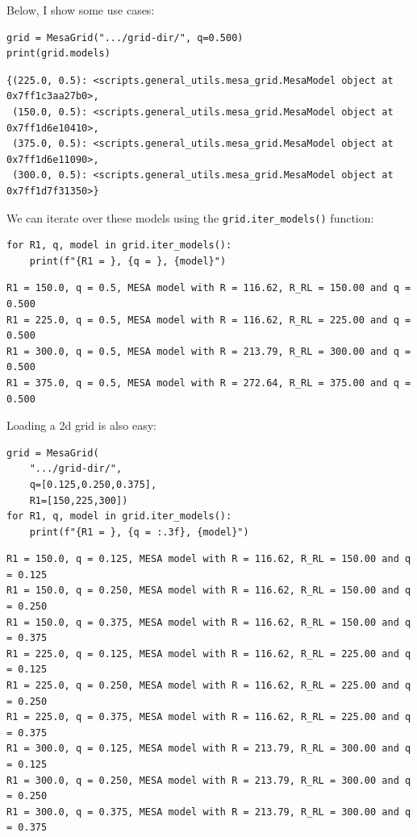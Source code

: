 \documentclass[a4paper,10pt]{article}
\begin{document}
Below, I show some use cases:
\begin{verbatim}
grid = MesaGrid(".../grid-dir/", q=0.500)
print(grid.models)
\end{verbatim}
\begin{verbatim}
{(225.0, 0.5): <scripts.general_utils.mesa_grid.MesaModel object at 0x7ff1c3aa27b0>,
 (150.0, 0.5): <scripts.general_utils.mesa_grid.MesaModel object at 0x7ff1d6e10410>,
 (375.0, 0.5): <scripts.general_utils.mesa_grid.MesaModel object at 0x7ff1d6e11090>,
 (300.0, 0.5): <scripts.general_utils.mesa_grid.MesaModel object at 0x7ff1d7f31350>}
\end{verbatim}
We can iterate over these models using the \lstinline[style=output, breaklines=true]|grid.iter_models()| function:
\begin{verbatim}
for R1, q, model in grid.iter_models():
    print(f"{R1 = }, {q = }, {model}")
\end{verbatim}
\begin{verbatim}
R1 = 150.0, q = 0.5, MESA model with R = 116.62, R_RL = 150.00 and q = 0.500 
R1 = 225.0, q = 0.5, MESA model with R = 116.62, R_RL = 225.00 and q = 0.500
R1 = 300.0, q = 0.5, MESA model with R = 213.79, R_RL = 300.00 and q = 0.500
R1 = 375.0, q = 0.5, MESA model with R = 272.64, R_RL = 375.00 and q = 0.500
\end{verbatim}

Loading a 2d grid is also easy:
\begin{verbatim}
grid = MesaGrid(
    ".../grid-dir/", 
    q=[0.125,0.250,0.375], 
    R1=[150,225,300])
for R1, q, model in grid.iter_models():
    print(f"{R1 = }, {q = :.3f}, {model}")
\end{verbatim}
\begin{verbatim}
R1 = 150.0, q = 0.125, MESA model with R = 116.62, R_RL = 150.00 and q = 0.125
R1 = 150.0, q = 0.250, MESA model with R = 116.62, R_RL = 150.00 and q = 0.250
R1 = 150.0, q = 0.375, MESA model with R = 116.62, R_RL = 150.00 and q = 0.375
R1 = 225.0, q = 0.125, MESA model with R = 116.62, R_RL = 225.00 and q = 0.125
R1 = 225.0, q = 0.250, MESA model with R = 116.62, R_RL = 225.00 and q = 0.250
R1 = 225.0, q = 0.375, MESA model with R = 116.62, R_RL = 225.00 and q = 0.375
R1 = 300.0, q = 0.125, MESA model with R = 213.79, R_RL = 300.00 and q = 0.125
R1 = 300.0, q = 0.250, MESA model with R = 213.79, R_RL = 300.00 and q = 0.250
R1 = 300.0, q = 0.375, MESA model with R = 213.79, R_RL = 300.00 and q = 0.375
\end{verbatim}
\end{document}
